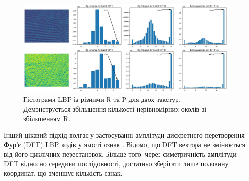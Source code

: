 \begin{figure}[h]
    \centering
    \includegraphics[width=0.99\textwidth]{img/cloth-hist-lbpu.jpg}
    \caption{
        Гістограми LBP із різними R та P для двох текстур.
        Демонструється збільшення кількості нерівномірних околів зі збільшенням R.
    }
    \label{fig:cloth-hist-lbpu}
\end{figure}

Інший цікавий підхід полгає у застосуванні амплітуди дискретного перетворення Фур'є (DFT) LBP кодів у якості ознак \cite{arof1998, haley1999}.
Відомо, що DFT вектора не змінюється від його циклічних перестановок. 
Більше того, через симетричність амплітуди DFT відносно середини послідовності, достатньо зберігати лише половину координат, що зменшує кількість ознак. 

